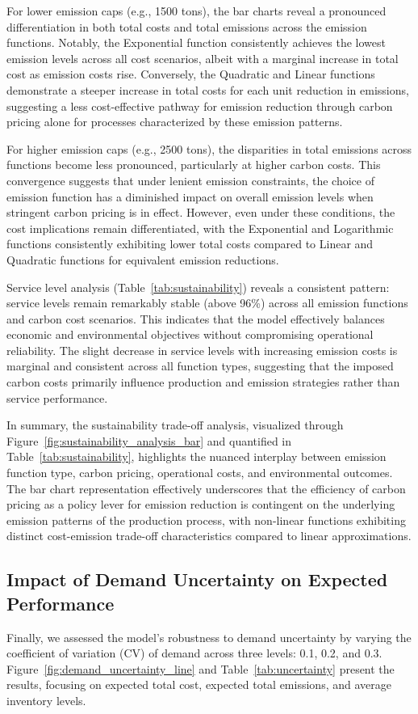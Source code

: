 \begin{table}[htbp]
For lower emission caps (e.g., 1500 tons), the bar charts reveal a pronounced differentiation in both total costs and total emissions across the emission functions. Notably, the Exponential function consistently achieves the lowest emission levels across all cost scenarios, albeit with a marginal increase in total cost as emission costs rise. Conversely, the Quadratic and Linear functions demonstrate a steeper increase in total costs for each unit reduction in emissions, suggesting a less cost-effective pathway for emission reduction through carbon pricing alone for processes characterized by these emission patterns.

For higher emission caps (e.g., 2500 tons), the disparities in total emissions across functions become less pronounced, particularly at higher carbon costs. This convergence suggests that under lenient emission constraints, the choice of emission function has a diminished impact on overall emission levels when stringent carbon pricing is in effect. However, even under these conditions, the cost implications remain differentiated, with the Exponential and Logarithmic functions consistently exhibiting lower total costs compared to Linear and Quadratic functions for equivalent emission reductions.

Service level analysis (Table~\ref{tab:sustainability}) reveals a consistent pattern: service levels remain remarkably stable (above 96\%) across all emission functions and carbon cost scenarios. This indicates that the model effectively balances economic and environmental objectives without compromising operational reliability. The slight decrease in service levels with increasing emission costs is marginal and consistent across all function types, suggesting that the imposed carbon costs primarily influence production and emission strategies rather than service performance.

In summary, the sustainability trade-off analysis, visualized through Figure~\ref{fig:sustainability_analysis_bar} and quantified in Table~\ref{tab:sustainability}, highlights the nuanced interplay between emission function type, carbon pricing, operational costs, and environmental outcomes.  The bar chart representation effectively underscores that the efficiency of carbon pricing as a policy lever for emission reduction is contingent on the underlying emission patterns of the production process, with non-linear functions exhibiting distinct cost-emission trade-off characteristics compared to linear approximations.

\subsection{Impact of Demand Uncertainty on Expected Performance}
\label{subsec:demand_uncertainty}
Finally, we assessed the model's robustness to demand uncertainty by varying the coefficient of variation (CV) of demand across three levels: 0.1, 0.2, and 0.3.  Figure~\ref{fig:demand_uncertainty_line} and Table~\ref{tab:uncertainty} present the results, focusing on expected total cost, expected total emissions, and average inventory levels.


\end{table}
